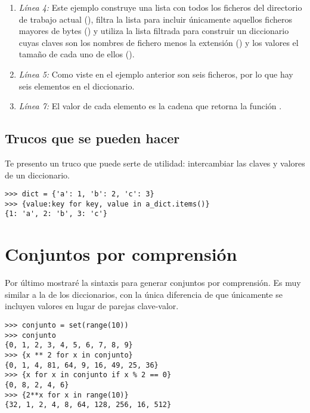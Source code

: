 \begin{enumerate}

\item \emph{Línea 4:} Este ejemplo construye una lista con todos los ficheros del directorio de trabajo actual (), filtra la lista para incluir únicamente aquellos ficheros mayores de  bytes () y utiliza la lista filtrada para construir un diccionario cuyas claves son los nombres de fichero menos la extensión () y los valores el tamaño de cada uno de ellos ().

\item \emph{Línea 5:} Como viste en el ejemplo anterior son seis ficheros, por lo que hay seis elementos en el diccionario.

\item \emph{Línea 7:} El valor de cada elemento es la cadena que retorna la función .

\end{enumerate}

\subsection{Trucos que se pueden hacer}

Te presento un truco que puede serte de utilidad: intercambiar las claves y valores de un diccionario.

\noindent\begin{minipage}{\textwidth}
\begin{lstlisting}[mathescape=True]
>>> dict = {'a': 1, 'b': 2, 'c': 3}
>>> {value:key for key, value in a_dict.items()}
{1: 'a', 2: 'b', 3: 'c'}
\end{lstlisting}
\end{minipage}

\section{Conjuntos por comprensión}

Por último mostraré la sintaxis para generar conjuntos por comprensión. Es muy similar a la de los diccionarios, con la única diferencia de que únicamente se incluyen valores en lugar de parejas clave-valor.

\noindent\begin{minipage}{\textwidth}
\begin{lstlisting}[mathescape=True]
>>> conjunto = set(range(10))
>>> conjunto
{0, 1, 2, 3, 4, 5, 6, 7, 8, 9}
>>> {x ** 2 for x in conjunto}
{0, 1, 4, 81, 64, 9, 16, 49, 25, 36}
>>> {x for x in conjunto if x % 2 == 0}
{0, 8, 2, 4, 6}
>>> {2**x for x in range(10)}
{32, 1, 2, 4, 8, 64, 128, 256, 16, 512}
\end{lstlisting}
\end{minipage}

